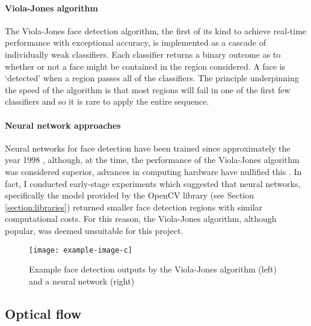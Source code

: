 \paragraph{Viola-Jones algorithm} 
The Viola-Jones face detection algorithm\cite{Viola2004}, the first of its kind to achieve real-time performance with exceptional accuracy, is implemented as a cascade of 
individually weak classifiers. Each classifier returns a binary outcome as to whether or not a face might be contained in the region considered.
A face is `detected' when a region passes all of the classifiers. The principle underpinning the speed of the algorithm is that most regions will fail in one of the first few classifiers
and so it is rare to apply the entire sequence.



\paragraph{Neural network approaches}
Neural networks for face detection have been trained since approximately the year 1998 \cite{655647}, although, at the time, the performance of the Viola-Jones algorithm was considered superior, 
advances in computing hardware have nullified this \cite{v-j-vs-ann}. In fact, I conducted early-stage experiments which suggested that neural networks, specifically the model provided by the OpenCV library (see 
Section \ref{section:libraries}) returned smaller face detection regions with similar computational costs. For this reason, the Viola-Jones algorithm, although popular, was deemed unsuitable for this project.
\begin{figure}[H]
    \texttt{[image: example-image-c]}
   \caption{Example face detection outputs by the Viola-Jones algorithm (left) and a neural network (right) } 
   \label{fig:face_det_example}
\end{figure}

\subsection{Optical flow}

